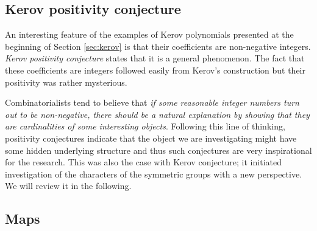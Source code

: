 \documentclass{emsprocart}
\theoremstyle{definition}
\begin{document}
\subsection{Kerov positivity conjecture}
An interesting feature of the examples of Kerov polynomials presented at the beginning of 
Section \ref{sec:kerov} is that
their coefficients are non-negative integers. 
\emph{Kerov positivity conjecture} states that it is a general phenomenon.
The fact that these coefficients are integers followed easily from 
Kerov's construction but
their positivity was rather mysterious. 

Combinatorialists tend to believe that
\emph{if some reasonable integer numbers turn out to be non-negative, 
there should be a natural explanation by showing
that they are cardinalities of some interesting objects}. 
Following this line of thinking, positivity conjectures indicate that the object we 
are investigating might have some hidden underlying structure and 
thus such conjectures are very inspirational for the research.
This was also the case with Kerov conjecture; it initiated investigation of the 
characters of the symmetric groups with a new perspective. We will review it in the following.

\subsection{Maps}
\end{document}
